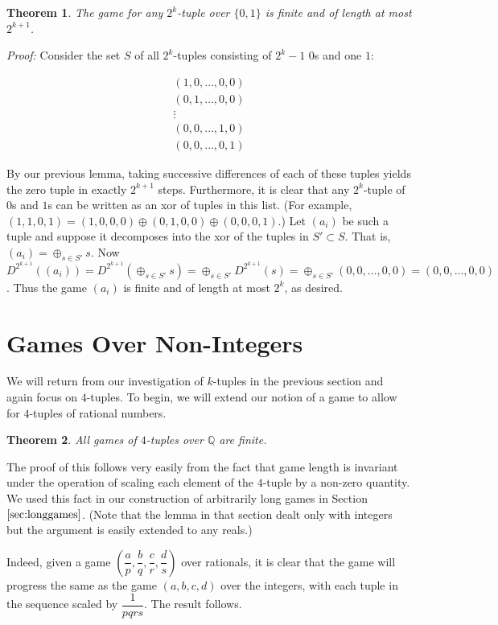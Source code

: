 \documentclass[12pt]{amsart}
\newtheorem{theorem}{Theorem}[section]
\newcommand{\xor}{\oplus}
\begin{document}
\begin{theorem}
The game for any $2^k$-tuple over $\{0,1\}$ is finite and of length at most $2^{k+1}$.
\end{theorem}

\textit{Proof:} Consider the set $S$ of all $2^k$-tuples consisting of $2^k-1$ $0$s and one $1$:

$$\begin{array}{c}
(1,0,\ldots,0,0) \\
(0,1,\ldots,0,0) \\
\vdots \\
(0,0,\ldots,1,0) \\
(0,0,\ldots,0,1)
\end{array}$$

By our previous lemma, taking successive differences of each of these tuples yields the zero tuple in exactly $2^{k+1}$ steps. Furthermore, it is clear that any $2^k$-tuple of $0$s and $1$s can be written as an xor of tuples in this list. (For example, $(1,1,0,1)=(1,0,0,0)\xor(0,1,0,0)\xor(0,0,0,1)$.) Let $(a_i)$ be such a tuple and suppose it decomposes into the xor of the tuples in $S'\subset S$. That is, $(a_i)=\xor_{s\in S'} s$. Now $D^{2^{k+1}}((a_i))=D^{2^{k+1}}(\xor_{s\in S'} s)=\xor_{s\in S'} D^{2^{k+1}}(s)=\xor_{s\in S'} (0,0,\ldots,0,0) = (0,0,\ldots,0,0)$. Thus the game $(a_i)$ is finite and of length at most $2^k$, as desired.

\section{Games Over Non-Integers}

We will return from our investigation of $k$-tuples in the previous section and again focus on $4$-tuples. To begin, we will extend our notion of a game to allow for $4$-tuples of rational numbers.

\begin{theorem}
All games of $4$-tuples over $\mathbb{Q}$ are finite.
\end{theorem}

The proof of this follows very easily from the fact that game length is invariant under the operation of scaling each element of the $4$-tuple by a non-zero quantity. We used this fact in our construction of arbitrarily long games in Section $\ref{sec:longgames}$. (Note that the lemma in that section dealt only with integers but the argument is easily extended to any reals.)

Indeed, given a game $\left(\dfrac{a}{p}, \dfrac{b}{q}, \dfrac{c}{r}, \dfrac{d}{s}\right)$ over rationals, it is clear that the game will progress the same as the game $(a, b, c, d)$ over the integers, with each tuple in the sequence scaled by $\dfrac{1}{pqrs}$. The result follows.
\end{document}
